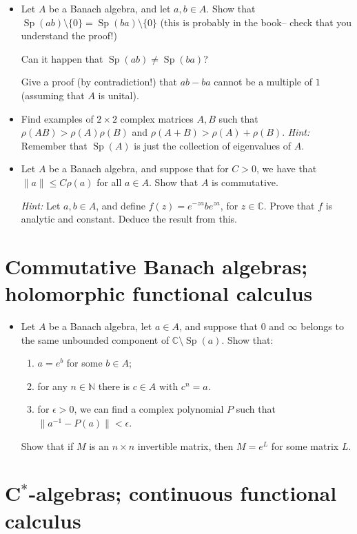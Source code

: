 \documentclass[twoside,12pt,a4paper]{article}
\newcommand{\Sp}{\operatorname{Sp}}
\begin{document}
\begin{itemize}
\item Let $A$ be a Banach algebra, and let $a,b\in A$.  Show that
$\Sp(ab)\setminus\{0\} = \Sp(ba)\setminus\{0\}$ (this is probably in
the book-- check that you understand the proof!)

Can it happen that $\Sp(ab)\not=\Sp(ba)$?

Give a proof (by contradiction!) that $ab-ba$ cannot be a multiple
of $1$ (assuming that $A$ is unital).

\item Find examples of $2\times 2$ complex matrices $A,B$ such that
$\rho(AB) > \rho(A)\rho(B)$ and $\rho(A+B) > \rho(A) + \rho(B)$.
\emph{Hint:} Remember that $\Sp(A)$ is just the collection of eigenvalues
of $A$.

\item Let $A$ be a Banach algebra, and suppose that for $C>0$, we have
that $\|a\| \leq C \rho(a)$ for all $a\in A$.  Show that $A$ is
commutative.

\emph{Hint:} Let $a,b\in A$, and define $f(z) = e^{-za} b e^{za}$, for
$z\in\mathbb C$.  Prove that $f$ is analytic and constant.  Deduce the
result from this.
\end{itemize}


\section{Commutative Banach algebras; holomorphic functional calculus}

\begin{itemize}
\item Let $A$ be a Banach algebra, let $a\in A$, and suppose that $0$
and $\infty$ belongs to the same unbounded component of
$\mathbb C\setminus\Sp(a)$.  Show that:
\begin{enumerate}
\item $a=e^b$ for some $b\in A$;
\item for any $n\in\mathbb N$ there is $c\in A$ with $c^n = a$.
\item for $\epsilon>0$, we can find a complex polynomial $P$ such that
$\| a^{-1} - P(a) \| < \epsilon$.
\end{enumerate}
Show that if $M$ is an $n\times n$ invertible matrix, then $M=e^L$ for
some matrix $L$.
\end{itemize}


\section{C$^*$-algebras; continuous functional calculus}
\end{document}
